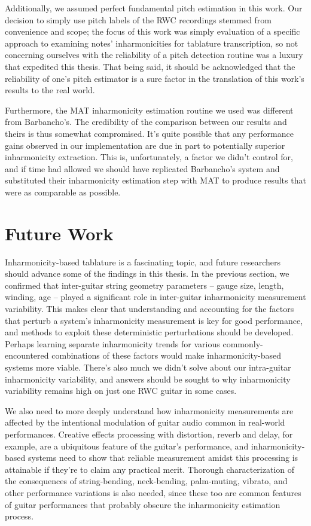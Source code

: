 \documentclass[12pt]{cmuthesis}
\begin{document}
Additionally, we assumed perfect fundamental pitch estimation in this work. Our decision to simply use pitch labels of the RWC recordings stemmed from convenience and scope; the focus of this work was simply evaluation of a specific approach to examining notes' inharmonicities for tablature transcription, so not concerning ourselves with the reliability of a pitch detection routine was a luxury that expedited this thesis. That being said, it should be acknowledged that the reliability of one's pitch estimator is a sure factor in the translation of this work's results to the real world.

Furthermore, the MAT inharmonicity estimation routine we used was different from Barbancho's. The credibility of the comparison between our results and theirs is thus somewhat compromised. It's quite possible that any performance gains observed in our implementation are due in part to potentially superior inharmonicity extraction. This is, unfortunately, a factor we didn't control for, and if time had allowed we should have replicated Barbancho's system and substituted their inharmonicity estimation step with MAT to produce results that were as comparable as possible.

\section{Future Work}
Inharmonicity-based tablature is a fascinating topic, and future researchers should advance some of the findings in this thesis. In the previous section, we confirmed that inter-guitar string geometry parameters -- gauge size, length, winding, age -- played a significant role in inter-guitar inharmonicity measurement variability. This makes clear that understanding and accounting for the factors that perturb a system's inharmonicity measurement is key for good performance, and methods to exploit these deterministic perturbations should be developed. Perhaps learning separate inharmonicity trends for various commonly-encountered combinations of these factors would make inharmonicity-based systems more viable. There's also much we didn't solve about our intra-guitar inharmonicity variability, and answers should be sought to why inharmonicity variability remains high on just one RWC guitar in some cases.

We also need to more deeply understand how inharmonicity measurements are affected by the intentional modulation of guitar audio common in real-world performances. Creative effects processing with distortion, reverb and delay, for example, are a ubiquitous feature of the guitar's performance, and inharmonicity-based systems need to show that reliable measurement amidst this processing is attainable if they're to claim any practical merit. Thorough characterization of the consequences of string-bending, neck-bending, palm-muting, vibrato, and other performance variations is also needed, since these too are common features of guitar performances that probably obscure the inharmonicity estimation process.
\end{document}
